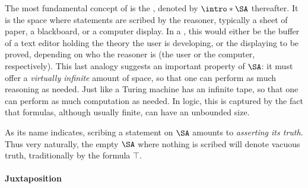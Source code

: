 \begin{scope}
\AP
The most fundamental concept of  is the ,
denoted by $\intro*\SA$ thereafter. It is the space where statements are scribed
by the reasoner, typically a sheet of paper, a blackboard, or a computer
display. In a , this would either be the buffer of a text editor
holding the theory the user is developing, or the  displaying  to
be proved, depending on who the reasoner is (the user or the computer,
respectively). This last analogy suggests an important property of $\SA$: it
must offer a \emph{virtually infinite} amount of space, so that one can perform
as much reasoning as needed. Just like a Turing machine has an infinite tape, so
that one can perform as much computation as needed. In  logic, this is
captured by the fact that formulas, although usually finite, can have an
unbounded size.

As its name indicates, scribing a statement on $\SA$ amounts to \emph{asserting
its truth}. Thus very naturally, the empty $\SA$ where nothing is scribed will
denote vacuous truth, traditionally  by the formula $\top$.


\paragraph{Juxtaposition}


\end{scope}
